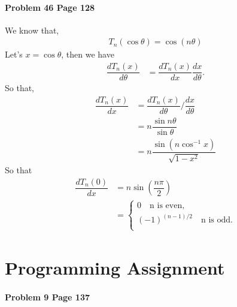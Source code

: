 \documentclass[paper=a4, fontsize=11pt]{scrartcl} %
\numberwithin{equation}{section} %
\numberwithin{figure}{section} %
\numberwithin{table}{section} %
\begin{document}
\paragraph{\textbf{Problem 46 Page 128}}
We know that,
\begin{align*}
	T_n(\cos\theta)=\cos(n\theta)
\end{align*}
Let's $x = \cos\theta$, then we have
\begin{align*}
	\dfrac{dT_n(x)}{d\theta}&=\dfrac{dT_n(x)}{dx} \dfrac{dx}{d\theta}. 
\end{align*}
So that,
\begin{align*}
	\dfrac{dT_n(x)}{dx}& =\dfrac{dT_n(x)}{d\theta} \Big/ \dfrac{dx}{d\theta} \\
                        & = n \dfrac{\sin n\theta}{\sin \theta}\\
                        & = n \dfrac{\sin \left( n \cos^{-1} x\right)}{\sqrt{1-x^2}}
\end{align*}
So that 
\begin{align*}
    \dfrac{dT_n(0)}{dx} & = n \sin \left( \dfrac{n\pi}{2}\right) \\	
                        & = \begin{cases}
                                0 \quad \text{n is even,}\\
                                (-1)^{(n-1)/2} \quad \text{n is odd.}\\
                            \end{cases}
\end{align*}




\newpage
\section*{Programming Assignment}
\paragraph{Problem 9 Page 137}


\end{document}
